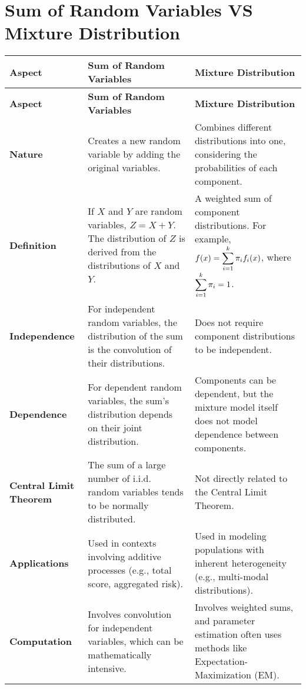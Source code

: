 \section{Sum of Random Variables VS Mixture Distribution \cite{chatgpt}}\label{Sum of Random Variables VS Mixture Distribution}

\begin{longtable}{|p{2.5cm}|p{5cm}|p{5cm}|}
    \hline
    \textbf{Aspect} & \textbf{Sum of Random Variables} & \textbf{Mixture Distribution} \\
    \hline
    \endfirsthead
    
    \hline
    \textbf{Aspect} & \textbf{Sum of Random Variables} & \textbf{Mixture Distribution} \\
    \hline
    \endhead
    
    \hline
    \endfoot
    
    \hline
    \endlastfoot
    
    \textbf{Nature} & 
    Creates a new random variable by adding the original variables. & 
    Combines different distributions into one, considering the probabilities of each component. \\
    \hline
    
    \textbf{Definition} & 
    If \( X \) and \( Y \) are random variables, \( Z = X + Y \). The distribution of \( Z \) is derived from the distributions of \( X \) and \( Y \). & 
    A weighted sum of component distributions. For example, \( f(x) = \displaystyle\sum_{i=1}^{k} \pi_i f_i(x) \), where \( \displaystyle\sum_{i=1}^{k} \pi_i = 1 \). \\
    \hline
    
    \textbf{Independence} & 
    For independent random variables, the distribution of the sum is the convolution of their distributions. & 
    Does not require component distributions to be independent. \\
    \hline
    
    \textbf{Dependence} & 
    For dependent random variables, the sum's distribution depends on their joint distribution. & 
    Components can be dependent, but the mixture model itself does not model dependence between components. \\
    \hline
    
    \textbf{Central Limit Theorem} & 
    The sum of a large number of i.i.d. random variables tends to be normally distributed. & 
    Not directly related to the Central Limit Theorem. \\
    \hline
    
    \textbf{Applications} & 
    Used in contexts involving additive processes (e.g., total score, aggregated risk). & 
    Used in modeling populations with inherent heterogeneity (e.g., multi-modal distributions). \\
    \hline
    
    \textbf{Computation} & 
    Involves convolution for independent variables, which can be mathematically intensive. & 
    Involves weighted sums, and parameter estimation often uses methods like Expectation-Maximization (EM). \\
    \hline

\end{longtable}
